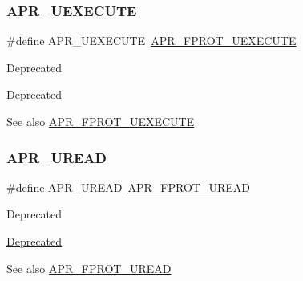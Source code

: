 \subsubsection{\texorpdfstring{A\+P\+R\+\_\+\+U\+E\+X\+E\+C\+U\+TE}{APR\_UEXECUTE}}
{\footnotesize\ttfamily \#define A\+P\+R\+\_\+\+U\+E\+X\+E\+C\+U\+TE~\mbox{\hyperlink{group__apr__file__permissions_ga156e1374a4ef30e745340d8c20b36d03}{A\+P\+R\+\_\+\+F\+P\+R\+O\+T\+\_\+\+U\+E\+X\+E\+C\+U\+TE}}}

\begin{DoxyRefDesc}{Deprecated}
\item[\mbox{\hyperlink{deprecated__deprecated000006}{Deprecated}}]\end{DoxyRefDesc}
\begin{DoxySeeAlso}{See also}
\mbox{\hyperlink{group__apr__file__permissions_ga156e1374a4ef30e745340d8c20b36d03}{A\+P\+R\+\_\+\+F\+P\+R\+O\+T\+\_\+\+U\+E\+X\+E\+C\+U\+TE}} 
\end{DoxySeeAlso}
\mbox{\label{group__apr__file__permissions_ga51dc87ecd94c98e97694e68d5d9620a0}} 
\subsubsection{\texorpdfstring{A\+P\+R\+\_\+\+U\+R\+E\+AD}{APR\_UREAD}}
{\footnotesize\ttfamily \#define A\+P\+R\+\_\+\+U\+R\+E\+AD~\mbox{\hyperlink{group__apr__file__permissions_gaab6c4c2e7b95f4345c248c27b3f1a655}{A\+P\+R\+\_\+\+F\+P\+R\+O\+T\+\_\+\+U\+R\+E\+AD}}}

\begin{DoxyRefDesc}{Deprecated}
\item[\mbox{\hyperlink{deprecated__deprecated000004}{Deprecated}}]\end{DoxyRefDesc}
\begin{DoxySeeAlso}{See also}
\mbox{\hyperlink{group__apr__file__permissions_gaab6c4c2e7b95f4345c248c27b3f1a655}{A\+P\+R\+\_\+\+F\+P\+R\+O\+T\+\_\+\+U\+R\+E\+AD}} 
\end{DoxySeeAlso}
\mbox{\label{group__apr__file__permissions_gafae6b531c08999345536cae5654d0d03}} 
